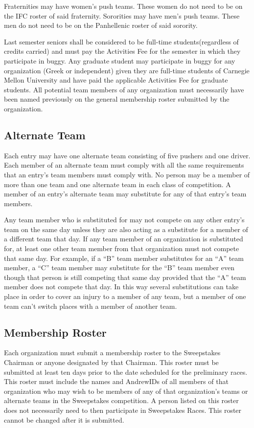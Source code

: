	Fraternities may have women's push teams. These women do not need to be on the IFC roster of said fraternity. Sororities may have men's push teams. These men do not need to be on the Panhellenic roster of said sorority.

	Last semester seniors shall be considered to be full-time students(regardless of credits carried) and must pay the Activities Fee for the semester in which they participate in buggy. Any graduate student may participate in buggy for any organization (Greek or independent) given they are full-time students of Carnegie Mellon University and have paid the applicable Activities Fee for graduate students. All potential team members of any organization must necessarily have been named previously on the general membership roster submitted by the organization.

\subsection{Alternate Team}

	Each entry may have one alternate team consisting of five pushers and one driver. Each member of an alternate team must comply with all the same requirements that an entry's team members must comply with. No person may be a member of more than one team and one alternate team in each class of competition. A member of an entry's alternate team may substitute for any of that entry's team members.

	Any team member who is substituted for may not compete on any other entry's team on the same day unless they are also acting as a substitute for a member of a different team that day. If any team member of an organization is substituted for, at least one other team member from that organization must not compete that same day. For example, if a “B” team member substitutes for an “A” team member, a “C” team member may substitute for the “B” team member even though that person is still competing that same day provided that the “A” team member does not compete that day. In this way several substitutions can take place in order to cover an injury to a member of any team, but a member of one team can't switch places with a member of another team.	

\subsection{Membership Roster}

	Each organization must submit a membership roster to the Sweepstakes Chairman or anyone designated by that Chairman. This roster must be submitted at least ten days prior to the date scheduled for the preliminary races. This roster must include the names and AndrewIDs of all members of that organization who may wish to be members of any of that organization's teams or alternate teams in the Sweepstakes competition. A person listed on this roster does not necessarily need to then participate in Sweepstakes Races. This roster cannot be changed after it is submitted.

